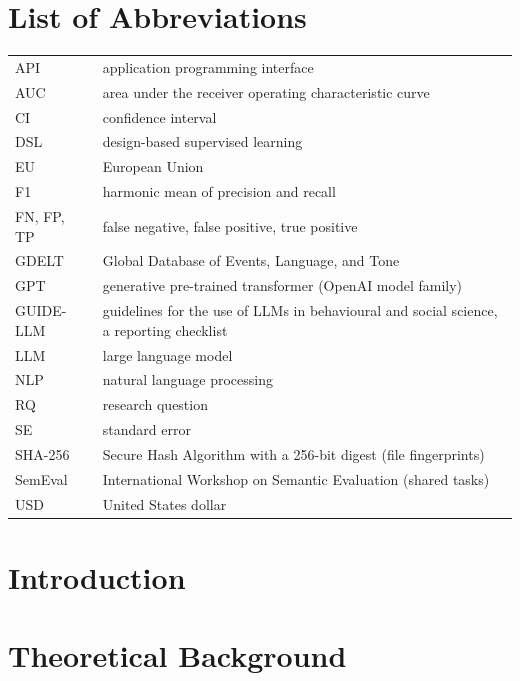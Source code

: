 \documentclass[12pt, a4paper]{article}
\theoremstyle{definition}
\begin{document}
\section*{List of Abbreviations}
\begin{tabular}{@{}l>{\raggedright\arraybackslash}p{118mm}@{}}
API & application programming interface \\
AUC & area under the receiver operating characteristic curve \\
CI & confidence interval \\
DSL & design-based supervised learning \parencite{egami2023dsl} \\
EU & European Union \\
F1 & harmonic mean of precision and recall \\
FN, FP, TP & false negative, false positive, true positive \\
GDELT & Global Database of Events, Language, and Tone \\
GPT & generative pre-trained transformer (OpenAI model family) \\
GUIDE-LLM & guidelines for the use of LLMs in behavioural and social science, a reporting checklist \parencite{feuerriegel2026guidellm} \\
LLM & large language model \\
NLP & natural language processing \\
RQ & research question \\
SE & standard error \\
SHA-256 & Secure Hash Algorithm with a 256-bit digest (file fingerprints) \\
SemEval & International Workshop on Semantic Evaluation (shared tasks) \\
USD & United States dollar \\
\end{tabular}

\newpage
{}\setcounter{frontmatterpages}{\value{page}}
\setcounter{page}{1}

\section{Introduction}\label{sec:introduction}


\section{Theoretical Background}\label{sec:background}

\end{document}
